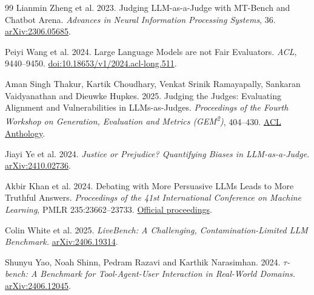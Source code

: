 {\begin{thebibliography}{99}
 Lianmin Zheng et al. 2023.
Judging LLM-as-a-Judge with MT-Bench and Chatbot Arena.
\emph{Advances in Neural Information Processing Systems}, 36.
\href{https://arxiv.org/abs/2306.05685}{arXiv:2306.05685}.

 Peiyi Wang et al. 2024.
Large Language Models are not Fair Evaluators. \emph{ACL}, 9440--9450.
\href{https://aclanthology.org/2024.acl-long.511/}{doi:10.18653/v1/2024.acl-long.511}.

 Aman Singh Thakur, Kartik Choudhary, Venkat Srinik Ramayapally,
Sankaran Vaidyanathan and Dieuwke Hupkes. 2025.
Judging the Judges: Evaluating Alignment and Vulnerabilities in LLMs-as-Judges.
\emph{Proceedings of the Fourth Workshop on Generation, Evaluation and Metrics (GEM\textsuperscript{2})}, 404--430.
\href{https://aclanthology.org/2025.gem-1.33/}{ACL Anthology}.

 Jiayi Ye et al. 2024.
\emph{Justice or Prejudice? Quantifying Biases in LLM-as-a-Judge.}
\href{https://arxiv.org/abs/2410.02736}{arXiv:2410.02736}.

 Akbir Khan et al. 2024.
Debating with More Persuasive LLMs Leads to More Truthful Answers.
\emph{Proceedings of the 41st International Conference on Machine Learning},
PMLR 235:23662--23733.
\href{https://proceedings.mlr.press/v235/khan24a.html}{Official proceedings}.

 Colin White et al. 2025.
\emph{LiveBench: A Challenging, Contamination-Limited LLM Benchmark.}
\href{https://arxiv.org/abs/2406.19314}{arXiv:2406.19314}.

 Shunyu Yao, Noah Shinn, Pedram Razavi and Karthik Narasimhan. 2024.
\emph{$\tau$-bench: A Benchmark for Tool-Agent-User Interaction in Real-World Domains.}
\href{https://arxiv.org/abs/2406.12045}{arXiv:2406.12045}.
\end{thebibliography}
}
